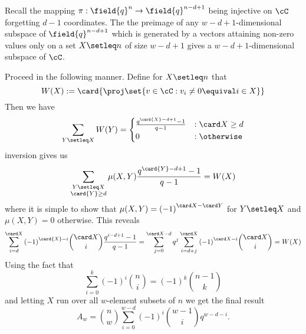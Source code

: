 \begin{solution}
    Recall the mapping $\pi:\field{q}^n\to\field{q}^{n-d+1}$ being injective on $\cC$ forgetting $d-1$ coordinates. The the preimage of any $w-d+1$-dimensional subspace of $\field{q}^{n-d+1}$ which is generated by a vectors attaining non-zero values only on a set $X\setleq n$ of size $w-d+1$ gives a $w-d+1$-dimensional subspace of $\cC$.
    
    Proceed in the following manner. Define for $X\setleq n$ that
    $$
    W(X):=\card{\proj\set{v\in \cC:v_i\neq 0\equival i\in X}}
    $$
    Then we have
    $$
    \sum_{Y\setleq X}{W(Y)}=
    \begin{cases}
        \frac{q^{\card{X}-d+1}-1}{q-1} &: \card X\geq d\\
        0 &: \otherwise    
    \end{cases}
    $$
     inversion gives us
    $$
    \sum_{\substack{Y\setleq X\\ \card{Y}\geq d}}{\mu(X,Y)\frac{q^{\card{Y}-d+1}-1}{q-1}}=W(X)
    $$
    where it is simple to show that $\mu(X,Y)={(-1)}^{\card X - \card Y}$ for $Y\setleq X$ and $\mu(X,Y)=0$ otherwise. This reveals
    $$
    \sum_{i=d}^{\card X}{{(-1)}^{\card{X}-i}\binom{\card X}{i}\frac{q^{i-d+1}-1}{q-1}}=\sum_{j=0}^{\card X-d}{q^j\sum_{i=d+j}^{\card X}{{(-1)}^{\card X -i}\binom{\card X}{i}}}=W(X)
    $$
    Using the fact that
    $$
    \sum_{i=0}^k{{(-1)}^i\binom{n}{i}}=(-1)^k\binom{n-1}{k}
    $$
    and letting $X$ run over all $w$-element subsets of $n$ we get the final result
    $$
    A_w=\binom{n}{w}\sum_{i=0}^{w-d}{{(-1)}^i\binom{w-1}{i}q^{w-d-i}}.
    $$
\end{solution}
